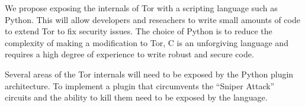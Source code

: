 \documentclass[9pt,technote]{IEEEtran}
\begin{document}
We propose exposing the internals of Tor with a scripting language such as
Python. This will allow developers and reseachers to write small amounts of code
to extend Tor to fix security issues. The choice of Python is to reduce the
complexity of making a modification to Tor, C is an unforgiving language and
requires a high degree of experience to write robust and secure code.

Several areas of the Tor internals will need to be exposed by the Python plugin
architecture. To implement a plugin that circumvents the ``Sniper Attack''
circuits and the ability to kill them need to be exposed by the language.



\end{document}
